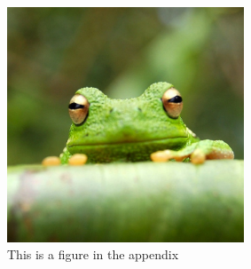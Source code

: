 \documentclass[9pt,bestpractices]{livecoms}
\begin{document}
\begin{figure}[hbt!]
\centering
\includegraphics[width=\linewidth,height=7cm]{frog}
\caption{This is a figure in the appendix}
\end{figure}
\end{document}
